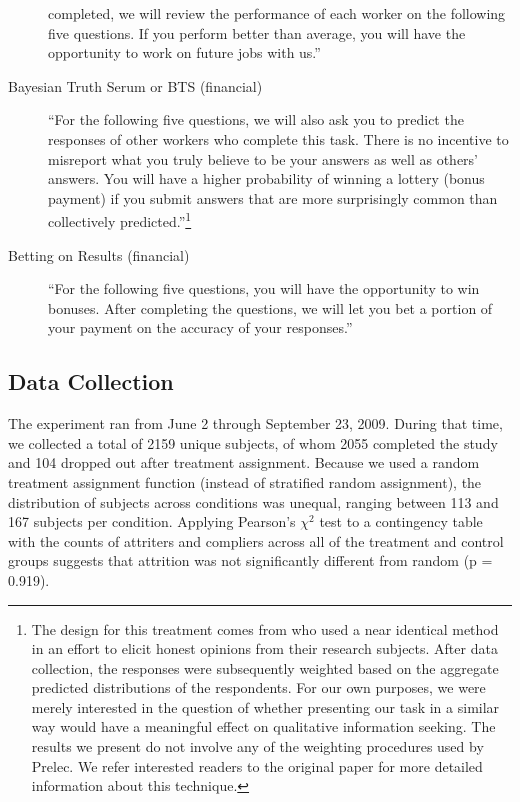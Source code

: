 \documentclass{cscw2010}
\begin{document}
\begin{description}
  completed, we will review the performance of each worker on the
  following five questions. If you perform better than average, you
  will have the opportunity to work on future jobs with us.'' %
\item[Bayesian Truth Serum or BTS (financial)] ``For the following
  five questions, we will also ask you to predict the responses of
  other workers who complete this task. There is no incentive to
  misreport what you truly believe to be your answers as well as
  others' answers. You will have a higher probability of winning a
  lottery (bonus payment) if you submit answers that are more
  surprisingly common than collectively predicted.''\footnote{The
    design for this treatment comes from \cite{prelec_bts_2004} who
    used a near identical method in an effort to elicit honest
    opinions from their research subjects. After data collection, the
    responses were subsequently weighted based on the aggregate
    predicted distributions of the respondents. For our own purposes,
    we were merely interested in the question of whether presenting
    our task in a similar way would have a meaningful effect on
    qualitative information seeking. The results we present do not
    involve any of the weighting procedures used by Prelec. We refer
    interested readers to the original paper for more detailed
    information about this technique.}
\item[Betting on Results (financial)] ``For the following five
  questions, you will have the opportunity to win bonuses. After
  completing the questions, we will let you bet a portion of your
  payment on the accuracy of your responses.'' %
\end{description} 

\subsection{Data Collection}
The experiment ran from June 2 through September 23, 2009. During that
time, we collected a total of 2159 unique subjects, of whom 2055
completed the study and 104 dropped out after treatment
assignment. Because we used a random treatment assignment function
(instead of stratified random assignment), the distribution of
subjects across conditions was unequal, ranging between 113 and 167
subjects per condition. Applying Pearson's $\chi^{2}$ test to a
contingency table with the counts of attriters and compliers across
all of the treatment and control groups suggests that attrition was
not significantly different from random (p = 0.919).
\end{document}
